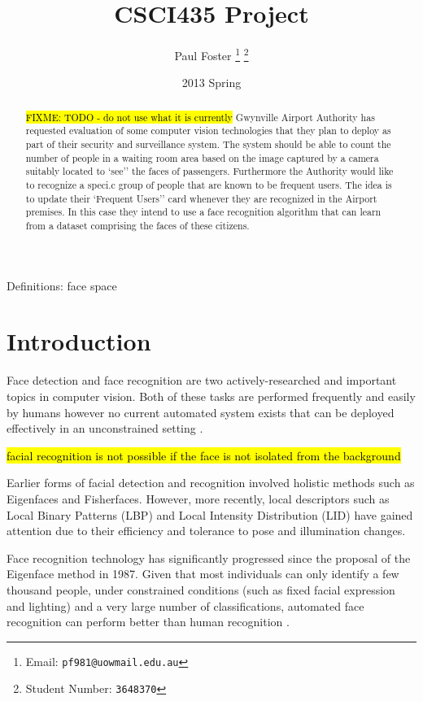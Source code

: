\documentclass{article}
\begin{document}
\title{CSCI435 Project}
\author{Paul Foster
	\thanks{Email: \texttt{pf981@uowmail.edu.au}}
	\thanks{Student Number: \texttt{3648370}}}
\date{2013 Spring}

\maketitle

\renewcommand\abstractname{Executive Summary}
\begin{abstract}
\hl{FIXME: TODO - do not use what it is currently}
Gwynville Airport Authority has requested evaluation of some computer vision
technologies that they plan to deploy as part of their security and surveillance system.
The system should be able to count the number of people in a waiting room area based
on the image captured by a camera suitably located to `see'' the faces of passengers. Furthermore the Authority would like to recognize a speci.c group of people that are known
to be frequent users. The idea is to update their `Frequent Users'' card whenever they
are recognized in the Airport premises. In this case they intend to use a face recognition
algorithm that can learn from a dataset comprising the faces of these citizens.
\end{abstract}

Definitions: face space

\section{Introduction}
Face detection and face recognition are two actively-researched and important topics in computer vision. Both of these tasks are performed frequently and easily by humans however no current automated system exists that can be deployed effectively in an unconstrained setting \cite{sinha2006face}.

\hl{facial recognition is not possible if the face is not isolated from the background}\cite{wilson2006facial}

Earlier forms of facial detection and recognition involved holistic methods such as Eigenfaces\cite{turk1991eigenfaces} and Fisherfaces\cite{belhumeur1997eigenfaces}. However, more recently, local descriptors such as Local Binary Patterns (LBP)\cite{ahonen2004face} and Local Intensity Distribution (LID)\cite{nguyen2011local} have gained attention due to their efficiency and tolerance to pose and illumination changes.

Face recognition technology has significantly progressed since the proposal of the Eigenface method in 1987. Given that most individuals can only identify a few thousand people, under constrained conditions (such as fixed facial expression and lighting) and a very large number of classifications, automated face recognition can perform better than human recognition \cite{li2011handbook}.
\end{document}
